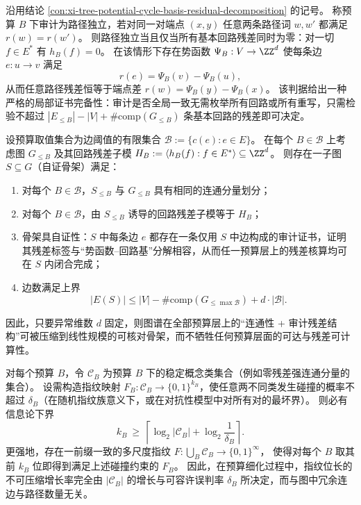 \begin{conclusion}[全局审计一致性的有限检验原理]\label{con:xi-global-audit-consistency-finite-test}
沿用结论 \ref{con:xi-tree-potential-cycle-basis-residual-decomposition} 的记号。
称预算 \(B\) 下审计为路径独立，若对同一对端点 \((x,y)\) 任意两条路径词 \(w,w'\) 都满足 \(r(w)=r(w')\)。
则路径独立当且仅当所有基本回路残差同时为零：对一切 \(f\in E^\ast\) 有 \(h_B(f)=0\)。
在该情形下存在势函数 \(\Psi_B:V\to\ZZ^d\) 使每条边 \(e:u\to v\) 满足
\[
r(e)=\Psi_B(v)-\Psi_B(u),
\]
从而任意路径残差恒等于端点差 \(r(w)=\Psi_B(y)-\Psi_B(x)\)。
该判据给出一种严格的局部证书完备性：审计是否全局一致无需枚举所有回路或所有重写，只需检验不超过
\(
|E_{\le B}|-|V|+\#\mathrm{comp}(G_{\le B})
\)
条基本回路的残差即可决定。
\end{conclusion}

\begin{conclusion}\label{con:xi-self-certifying-skeleton-all-budgets}
设预算取值集合为边阈值的有限集合
\(
\mathcal{B}:=\{c(e):e\in E\}
\)。
在每个 \(B\in\mathcal{B}\) 上考虑图 \(G_{\le B}\) 及其回路残差子模
\(
H_B:=\langle h_B(f):f\in E^\ast\rangle\subseteq\ZZ^d
\)。
则存在一子图 \(S\subseteq G\)（自证骨架）满足：
\begin{enumerate}
  \item 对每个 \(B\in\mathcal{B}\)，\(S_{\le B}\) 与 \(G_{\le B}\) 具有相同的连通分量划分；
  \item 对每个 \(B\in\mathcal{B}\)，由 \(S_{\le B}\) 诱导的回路残差子模等于 \(H_B\)；
  \item 骨架具自证性：\(S\) 中每条边 \(e\) 都存在一条仅用 \(S\) 中边构成的审计证书，证明其残差标签与“势函数--回路基”分解相容，从而任一预算层上的残差核算均可在 \(S\) 内闭合完成；
  \item 边数满足上界
  \[
  |E(S)|\le |V|-\#\mathrm{comp}(G_{\le \max\mathcal{B}})+d\cdot|\mathcal{B}|.
  \]
\end{enumerate}
因此，只要异常维数 \(d\) 固定，则图谱在全部预算层上的“连通性 + 审计残差结构”可被压缩到线性规模的可核对骨架，而不牺牲任何预算层面的可达与残差可计算性。
\end{conclusion}

\begin{conclusion}\label{con:xi-multiscale-fingerprint-optimal-bitlength}
对每个预算 \(B\)，令 \(\mathcal{C}_B\) 为预算 \(B\) 下的稳定概念类集合（例如零残差强连通分量的集合）。
设需构造指纹映射 \(F_B:\mathcal{C}_B\to\{0,1\}^{k_B}\)，使任意两不同类发生碰撞的概率不超过 \(\delta_B\)（在随机指纹族意义下，或在对抗性模型中对所有对的最坏界）。
则必有信息论下界
\[
k_B\ \ge\ \left\lceil \log_2 |\mathcal{C}_B|+\log_2\frac1{\delta_B}\right\rceil.
\]
更强地，存在一前缀一致的多尺度指纹
\(
F:\bigcup_B \mathcal{C}_B\to\{0,1\}^\infty
\)，
使得对每个 \(B\) 取其前 \(k_B\) 位即得到满足上述碰撞约束的 \(F_B\)。
因此，在预算细化过程中，指纹位长的不可压缩增长率完全由 \(|\mathcal{C}_B|\) 的增长与可容许误判率 \(\delta_B\) 所决定，而与图中冗余连边与路径数量无关。
\end{conclusion}

